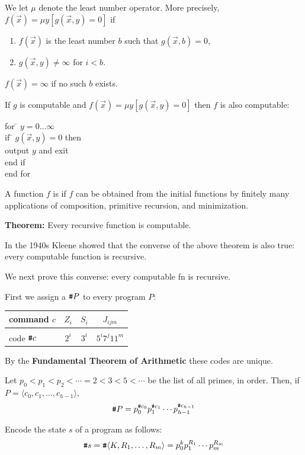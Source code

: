 \begin{frame}
We let $\mu$ denote the least number operator.  More precisely,
$f(\vec{x})=\mu y[g(\vec{x},y)=0]$ if
\begin{enumerate}
\item  $f(\vec{x})$ is the least number $b$ such that
$g(\vec{x},b)=0$,
\item  $g(\vec{x},y)\neq\infty$ for $i<b$.
\end{enumerate}
$f(\vec{x})=\infty$ if no such $b$ exists.

If $g$ is computable and $f(\vec{x})=\mu y[g(\vec{x},y)=0]$ then $f$
is also computable:

\begin{tabbing}
for \= $y=0\ldots\infty$ \\
    \> if \= $g(\vec{x},y)=0$ then \\
    \>    \> output $y$ and exit \\
    \> end if \\
end for
\end{tabbing}
\end{frame}

\begin{frame}
A function $f$ is  if $f$ can be obtained from the
initial functions by finitely many applications of composition,
primitive recursion, and minimization.

{\bf Theorem:} Every recursive function is computable.

In the 1940s Kleene showed that the converse of the above theorem is
also true: every computable function is recursive.

We next prove this converse: every computable fn is recursive.
\end{frame}

\begin{frame}
First we assign a  $\texttt{\#} P$ to every program
$P$:

\begin{tabular}{l|c|c|c}
command $c$ & $Z_i$ & $S_i$ & $J_{ijm}$ \\\hline
&&& \\
code    $\texttt{\#} c$ & $2^i$ & $3^i$ & $5^i7^j11^m$
\end{tabular}

By the {\bf Fundamental Theorem of Arithmetic} these codes are unique.

Let $p_0<p_1<p_2<\cdots=2<3<5<\cdots$ be the list of all primes, in
order.  Then, if $P=\langle c_0,c_1,\ldots,c_{h-1}\rangle$,
$$
\texttt{\#} P=p_0^{\texttt{\#} c_0}p_1^{\texttt{\#} c_1}\cdots p_{h-1}^{\texttt{\#} c_{h-1}}
$$

Encode the state $s$ of a program as follows:
$$
\texttt{\#} s=\texttt{\#}\langle K,R_1,\ldots,R_m\rangle
=p_0^kp_1^{R_1}\cdots p_m^{R_m}
$$
\end{frame}

